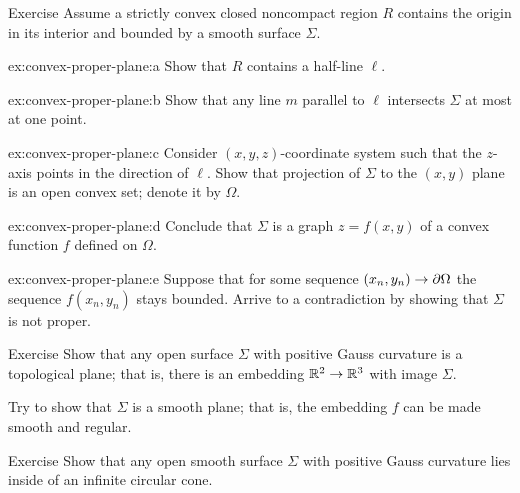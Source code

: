 {\begin{thm}{Exercise}\label{ex:convex-proper-plane}
Assume a strictly convex closed noncompact region $R$ contains the origin in its interior and bounded by a smooth surface $\Sigma$.

\begin{subthm}{ex:convex-proper-plane:a}
Show that $R$ contains a half-line $\ell$.
\end{subthm}

\begin{subthm}{ex:convex-proper-plane:b}
Show that any line $m$ parallel to $\ell$ intersects $\Sigma$ at most at one point.
\end{subthm}


\begin{subthm}{ex:convex-proper-plane:c}
Consider $(x,y,z)$-coordinate system such that the $z$-axis points in the direction of $\ell$.
Show that projection of $\Sigma$ to the $(x,y)$ plane is an open convex set; denote it by $\Omega$.
\end{subthm}

\begin{subthm}{ex:convex-proper-plane:d}
Conclude that $\Sigma$ is a graph $z=f(x,y)$ of a convex function $f$ defined on $\Omega$.
\end{subthm}

\begin{subthm}{ex:convex-proper-plane:e}
Suppose that for some sequence $(x_n,y_n)\z\to\partial\Omega$ the sequence $f(x_n,y_n)$ stays bounded.
Arrive to a contradiction by showing that $\Sigma$ is not proper. 
\end{subthm}


\end{thm}



}

\begin{thm}{Exercise}\label{ex:open+convex=plane}
Show that any open surface $\Sigma$ with positive Gauss curvature is a topological plane;
that is, there is an embedding $\mathbb{R}^2\to\mathbb{R}^3$ with image $\Sigma$.

Try to show that $\Sigma$ is a smooth plane; that is, the embedding $f$ can be made smooth and regular.
\end{thm}

\begin{thm}{Exercise}\label{ex:circular-cone}
Show that any open smooth surface $\Sigma$ with positive Gauss curvature
lies inside of an infinite circular cone. 
\end{thm} 

